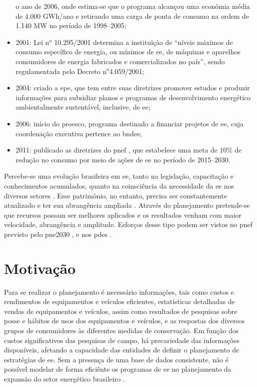 \begin{itemize}
o ano de 2006, onde estima-se que o programa alcançou uma econômia média de 
4.000 GWh/ano e retirando uma carga de ponta de consumo na ordem de 1.140 MW no período de 1998--2005;
\item 2001: Lei n$^\text{o}$ 10.295/2001 determina a instituição de ``níveis
máximos de consumo específico de energia, ou mínimos de \gls{ee},
de máquinas e aparelhos consumidores de energia fabricados e comercializados no
país'', sendo regulamentada pelo Decreto n$^\text{o}$4.059/2001;
\item 2004: criado a \gls{epe}, que tem entre suas diretrizes promover estudos e
produzir informações para subsidiar planos e programas de desenvolvimento
energético ambientalmente sustentável, inclusive, de \gls{ee};
\item 2006: início do \gls{proesco}, programa destinado a financiar projetos de
\gls{ee}, cuja coordenação executiva pertence ao \gls{bndes};
\item 2011: publicado as diretrizes do \gls{pnef} \cite{pnef}, que estabelece uma meta de
10\% de redução no consumo por meio de ações de \gls{ee} no período 
de 2015--2030.
\end{itemize}

Percebe-se uma evolução brasileira em \gls{ee}, tanto na legislação, 
capacitação e conhecimentos acumulados, quanto na 
coinsciência da necessidade da \gls{ee} nos diversos setores \cite{pnef}. 
Esse patrimônio, no entanto, precisa ser constantemente atualizado 
e ter sua abrangência ampliada \cite{pne30_eff_energ}. Através do planejamento pretende-se que
recursos possam ser melhores aplicados e os resultados venham com maior
velocidade, abrangência e amplitude. Esforços desse tipo podem ser vistos no
\gls{pnef} \cite{pnef} previsto pelo \gls{pne2030} \cite{pne30_eff_energ}, e nos
\glspl{pde} \cite{pde_2012}.

\section{Motivação}

Para se realizar o planejamento é necessário informações, tais como custos e
rendimentos de equipamentos e veículos eficientes, estatísticas detalhadas de
vendas de equipamentos e veículos, assim como resultados de pesquisas sobre
posse e hábitos de usos dos equipamentos e veículos, e as respostas dos diversos
grupos de consumidores às diferentes medidas de conservação. Em função dos
custos significativos das pesquisas de campo, há precariedade das informações
disponíveis, afetando a capacidade das entidades de definir o planejamento de
estratégias de \gls{ee}. Sem a presença de uma base de dados consistente, 
não é possível modelar de forma eficiênte os programas de \gls{ee} no
planejamento da expansão do setor energético brasileiro \cite{pne30_eff_energ}. 

